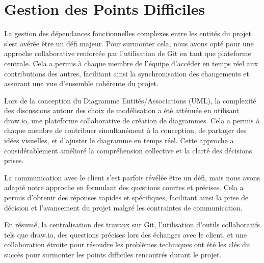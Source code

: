 \section{Gestion des Points Difficiles}

La gestion des dépendances fonctionnelles complexes entre les entités du projet s'est avérée être un défi majeur. Pour surmonter cela, nous avons opté pour une approche collaborative renforcée par l'utilisation de Git en tant que plateforme centrale. Cela a permis à chaque membre de l'équipe d'accéder en temps réel aux contributions des autres, facilitant ainsi la synchronisation des changements et assurant une vue d'ensemble cohérente du projet.

Lors de la conception du Diagramme Entités/Associations (UML), la complexité des discussions autour des choix de modélisation a été atténuée en utilisant draw.io, une plateforme collaborative de création de diagrammes. Cela a permis à chaque membre de contribuer simultanément à la conception, de partager des idées visuelles, et d'ajuster le diagramme en temps réel. Cette approche a considérablement amélioré la compréhension collective et la clarté des décisions prises.

La communication avec le client s'est parfois révélée être un défi, mais nous avons adapté notre approche en formulant des questions courtes et précises. Cela a permis d'obtenir des réponses rapides et spécifiques, facilitant ainsi la prise de décision et l'avancement du projet malgré les contraintes de communication.

En résumé, la centralisation des travaux sur Git, l'utilisation d'outils collaboratifs tels que draw.io, des questions précises lors des échanges avec le client, et une collaboration étroite pour résoudre les problèmes techniques ont été les clés du succès pour surmonter les points difficiles rencontrés durant le projet.